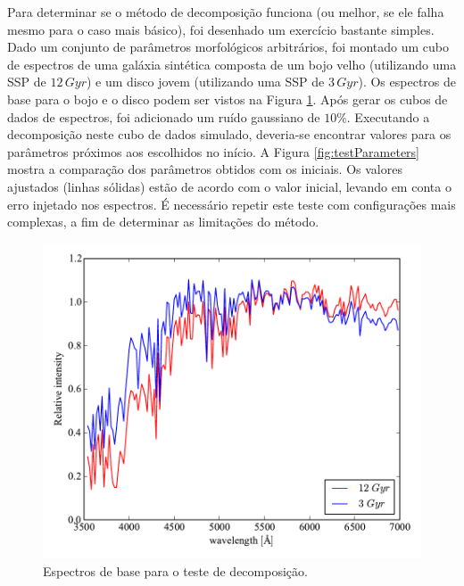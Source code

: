 Para determinar se o método de decomposição funciona (ou melhor, se ele falha
mesmo para o caso mais básico), foi desenhado um exercício bastante simples.
Dado um conjunto de parâmetros morfológicos arbitrários, foi montado um cubo de
espectros de uma galáxia sintética composta de um bojo velho (utilizando uma SSP
de $12\,Gyr$) e um disco jovem (utilizando uma SSP de $3\,Gyr$). Os espectros de
base para o bojo e o disco podem ser vistos na Figura \ref{fig:testSpectra}.
Após gerar os cubos de dados de espectros, foi adicionado um ruído gaussiano de
$10\%$. Executando a decomposição neste cubo de dados simulado, deveria-se
encontrar valores para os parâmetros próximos aos escolhidos no início. A Figura
\ref{fig:testParameters} mostra a comparação dos parâmetros obtidos com os
iniciais. Os valores ajustados (linhas sólidas) estão de acordo com o valor
inicial, levando em conta o erro injetado nos espectros. É necessário repetir
este teste com configurações mais complexas, a fim de determinar as limitações
do método.


\begin{figure}
	\includegraphics[width=0.7\columnwidth]{figuras/test-spectra}
	\caption[Espectros de base para o teste de decomposição] {Espectros de base
	para o teste de decomposição.}
	\label{fig:testSpectra}
\end{figure}


